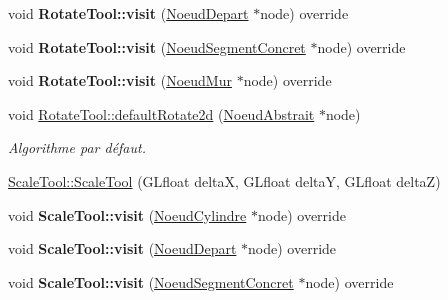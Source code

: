 \begin{DoxyCompactItemize}
\item 
\hypertarget{group__inf2990_ga9649bf652069731e900bb850bd3f8475}{void {\bfseries Rotate\-Tool\-::visit} (\hyperlink{class_noeud_depart}{Noeud\-Depart} $\ast$node) override}\label{group__inf2990_ga9649bf652069731e900bb850bd3f8475}

\item 
\hypertarget{group__inf2990_ga6a6b02897bd7b72119e7a4463d408d47}{void {\bfseries Rotate\-Tool\-::visit} (\hyperlink{class_noeud_segment_concret}{Noeud\-Segment\-Concret} $\ast$node) override}\label{group__inf2990_ga6a6b02897bd7b72119e7a4463d408d47}

\item 
\hypertarget{group__inf2990_gaa3542aa6a6a3f763a133b4003d30c41f}{void {\bfseries Rotate\-Tool\-::visit} (\hyperlink{class_noeud_mur}{Noeud\-Mur} $\ast$node) override}\label{group__inf2990_gaa3542aa6a6a3f763a133b4003d30c41f}

\item 
\hypertarget{group__inf2990_ga3d7a6452fd82b9684e5e24ed3aeef6b5}{void \hyperlink{group__inf2990_ga3d7a6452fd82b9684e5e24ed3aeef6b5}{Rotate\-Tool\-::default\-Rotate2d} (\hyperlink{class_noeud_abstrait}{Noeud\-Abstrait} $\ast$node)}\label{group__inf2990_ga3d7a6452fd82b9684e5e24ed3aeef6b5}

\begin{DoxyCompactList}\small\item\em Algorithme par défaut. \end{DoxyCompactList}\item 
\hyperlink{group__inf2990_ga87222e8bea8ff2b71862e5993d1a3669}{Scale\-Tool\-::\-Scale\-Tool} (G\-Lfloat delta\-X, G\-Lfloat delta\-Y, G\-Lfloat delta\-Z)
\item 
\hypertarget{group__inf2990_gab8949c8d5e040c10f62d385129a586f2}{void {\bfseries Scale\-Tool\-::visit} (\hyperlink{class_noeud_cylindre}{Noeud\-Cylindre} $\ast$node) override}\label{group__inf2990_gab8949c8d5e040c10f62d385129a586f2}

\item 
\hypertarget{group__inf2990_ga15d28436292d75172260ec68ae29807c}{void {\bfseries Scale\-Tool\-::visit} (\hyperlink{class_noeud_depart}{Noeud\-Depart} $\ast$node) override}\label{group__inf2990_ga15d28436292d75172260ec68ae29807c}

\item 
\hypertarget{group__inf2990_ga72ea4561dcc66cbdc0a9d52e12c7be90}{void {\bfseries Scale\-Tool\-::visit} (\hyperlink{class_noeud_segment_concret}{Noeud\-Segment\-Concret} $\ast$node) override}\label{group__inf2990_ga72ea4561dcc66cbdc0a9d52e12c7be90}


\end{DoxyCompactItemize}
